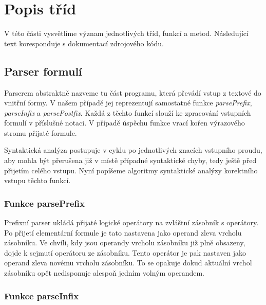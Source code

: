 \documentclass[thesis=B,czech,hidelinks]{thesis}[2012/06/26]
\begin{document}
\section{Popis tříd}

V této části vysvětlíme význam jednotlivých tříd, funkcí a metod. Následující text koresponduje s dokumentací zdrojového kódu.

























\subsection{Parser formulí}

Parserem abstraktně nazveme tu část programu, která převádí vstup z textové do vnitřní formy. V našem případě jej reprezentují samostatné funkce \emph{parsePrefix}, \emph{parseInfix} a \emph{parsePostfix}. Každá z těchto funkcí slouží ke zpracování vstupních formulí v příslušné notaci. V případě úspěchu funkce vrací kořen výrazového stromu přijaté formule.

Syntaktická analýza postupuje v cyklu po jednotlivých znacích vstupního proudu, aby mohla být přerušena již v místě případné syntaktické chyby, tedy ještě před přijetím celého vstupu. Nyní popíšeme algoritmy syntaktické analýzy korektního vstupu těchto funkcí.

\subsubsection{Funkce parsePrefix}

Prefixní parser ukládá přijaté logické operátory na zvláštní zásobník s operátory. Po přijetí elementární formule je tato nastavena jako operand zleva vrcholu zásobníku. Ve chvíli, kdy jsou operandy vrcholu zásobníku již plně obsazeny, dojde k sejmutí operátoru ze zásobníku. Tento operátor je pak nastaven jako operand zleva novému vrcholu zásobníku. To se opakuje dokud aktuální vrchol zásobníku opět nedisponuje alespoň jedním volným operandem.

\subsubsection{Funkce parseInfix}
\end{document}
